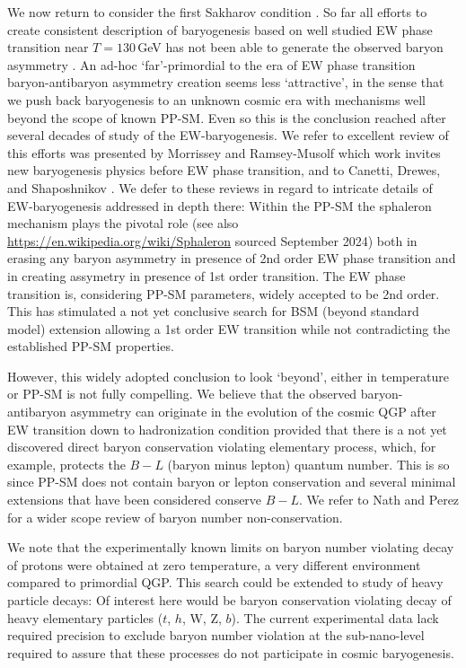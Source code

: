 {\color{black} We now return to consider the first Sakharov condition .  So far all efforts to create consistent description of baryogenesis based on well studied EW phase transition near $T=130$\,GeV has not been able to generate the observed baryon asymmetry \cite{Kuzmin:1985mm,Kuzmin:1987wn,Arnold:1987mh,Kolb:1996jt,Riotto:1999yt,Nielsen:2001fy,Giudice:2003jh,Davidson:2008bu,Morrissey:2012db,Canetti:2012zc}. An ad-hoc `far'-primordial to the era of EW  phase transition baryon-antibaryon asymmetry creation seems less `attractive', in the sense that we push back baryogenesis to an unknown cosmic era with mechanisms well beyond the scope of known PP-SM. Even so this is the conclusion reached after several decades of study of the EW-baryogenesis. We refer to excellent review of this efforts was presented by Morrissey and Ramsey-Musolf \cite{Morrissey:2012db} which work invites new baryogenesis physics before EW phase transition, and to Canetti, Drewes,  and Shaposhnikov \cite{Canetti:2012zc}. We defer to these reviews in regard to intricate details of EW-baryogenesis  addressed in depth there: Within the PP-SM the sphaleron mechanism plays the pivotal role (see also \url{https://en.wikipedia.org/wiki/Sphaleron} sourced September 2024) both in erasing any baryon asymmetry in presence of 2nd order EW phase transition and in creating assymetry in presence of 1st order transition. The EW phase transition is, considering PP-SM parameters, widely accepted to be 2nd order. This has stimulated a not yet conclusive search for BSM (beyond standard model) extension allowing a 1st order EW transition while not contradicting the established PP-SM properties.}

{\color{black}However, this  widely adopted conclusion to look `beyond', either in temperature or PP-SM is not fully compelling. We believe that the observed baryon-antibaryon  asymmetry can originate in the evolution of the cosmic QGP after EW transition down to hadronization condition provided that there is a  not yet discovered direct baryon conservation violating elementary process, which, for example, protects the $B-L$ (baryon minus lepton) quantum number. This is so since PP-SM does not contain baryon or lepton conservation and several minimal extensions that have been considered conserve $B-L$.  We refer to Nath and Perez \cite{Nath:2006ut} for a wider scope review of baryon number non-conservation. }

{\color{black}We note that the experimentally known limits on baryon number violating decay of protons were obtained at zero temperature, a very different environment compared to primordial QGP. This search could be extended to study of heavy particle decays: Of interest here would be baryon conservation violating decay of heavy elementary particles ($t$, $h$, W, Z, $b$). The current experimental data lack required precision to exclude  baryon number violation at the sub-nano-level required to assure that these processes do not participate in cosmic baryogenesis.} 
 

